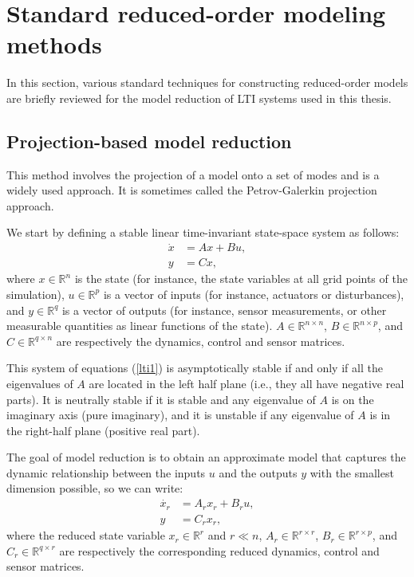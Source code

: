 \documentclass[12pt,lot, lof]{puthesis}
\begin{document}


\section{Standard reduced-order modeling methods}
\label{standard}
In this section, various standard techniques for constructing reduced-order models are briefly reviewed  for the model reduction of LTI systems used in this thesis.

\subsection{Projection-based model reduction}
This method involves the projection of a model onto a set of modes and is a widely used approach. It is sometimes called the Petrov-Galerkin projection approach.

We start by defining a stable linear time-invariant state-space system as follows: 
\begin{equation}
\label{lti1}
\begin{aligned}
	\dot{x}&= A x  + B u,   \\
	y &= C x ,
\end{aligned}
\end{equation}
where $x \in \mathbb{R}^n$ is the state (for instance, the state variables at all  grid points of the simulation), $u \in \mathbb{R}^p$ is a vector of inputs (for instance, actuators or disturbances), and $y \in \mathbb{R}^q$ is a vector of outputs (for instance, sensor measurements, or other measurable quantities as linear functions of the state). $A \in \mathbb{R}^{n \times n}$, $B \in \mathbb{R}^{n \times p}$, and $C \in \mathbb{R}^{q \times n}$ are respectively the dynamics, control and sensor matrices.

This system of equations (\ref{lti1}) is asymptotically stable if and only if all the eigenvalues of $A$ are located in the left half plane (i.e., they all have negative real parts). It is neutrally stable if it is stable and any eigenvalue of $A$ is on the imaginary axis (pure imaginary), and it is unstable if any eigenvalue of $A$ is in the right-half plane (positive real part).

The goal of model reduction is to obtain an approximate model that captures the dynamic relationship between the inputs $u$ and the outputs $y$ with the smallest dimension possible, so we can write:
\begin{equation}
\label{linSS3}
\begin{aligned}
	\dot{x_r}&= A_r x_r  + B_r u,   \\
	y &= C_r x_r ,
\end{aligned}
\end{equation}
where the reduced state variable $x_r \in \mathbb{R}^r$ and $r \ll n$, $A_r \in \mathbb{R}^{r \times r}$, $B_r \in \mathbb{R}^{r \times p}$, and $C_r \in \mathbb{R}^{q \times r}$ are respectively the corresponding reduced dynamics, control and sensor matrices.
\end{document}
